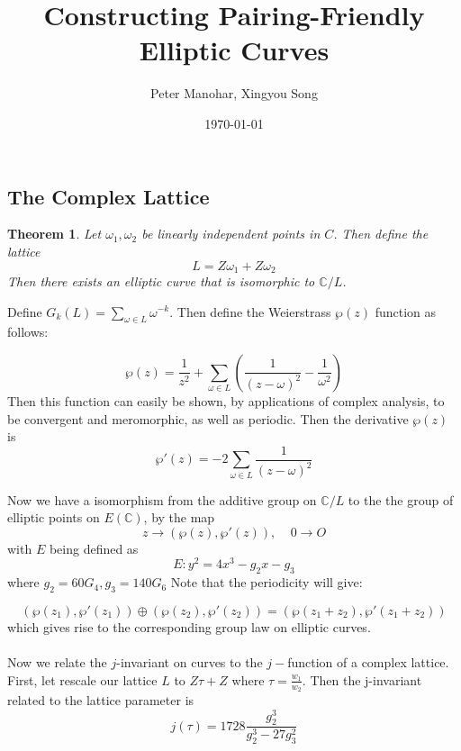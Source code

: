 \documentclass[12pt,twoside]{article}
\title{Constructing Pairing-Friendly Elliptic Curves }
\date{\today}
\author{ Peter Manohar, Xingyou Song}
\newtheorem{theorem}{Theorem}
\begin{document}
\subsection{The Complex Lattice}
\begin{theorem} 
Let $\omega_{1}, \omega_{2}$ be linearly independent points in $C$. Then define the lattice 
$$ L = Z\omega_{1} + Z \omega_{2}$$ Then there exists an elliptic curve that is isomorphic to $\mathbb{C}/ L$. 
\end{theorem}
Define $G_{k}(L) = \sum_{\omega \in L}\omega^{-k}$. Then define the Weierstrass $\wp (z) $ function as follows: 

\begin{equation} 
\wp(z) = \frac{1}{z^{2}} + \sum_{\omega \in L}\left(\frac{1}{(z-\omega)^{2}} - \frac{1}{\omega^{2}}\right) 
\end{equation}  
Then this function can easily be shown, by applications of complex analysis, to be convergent and meromorphic, as well as periodic. Then the derivative $\wp(z)$ is 
\begin{equation} 
\wp ' (z) = -2 \sum_{\omega \in L} \frac{1}{(z- \omega)^{2}} 
\end{equation} 

Now we have a isomorphism from the additive group on $\mathbb{C}/L$ to the the group of elliptic points on $E(\mathbb{C})$, by the map $$z \rightarrow ( \wp(z), \wp' (z)), \> \> \> \> \> 0 \rightarrow O $$ with $E$ being defined as 
\begin{equation} 
E: y^{2} = 4x^{3} - g_{2}x - g_{3} 
\end{equation} 
where $g_{2} = 60G_{4}, g_{3} = 140G_{6}$  
Note that the periodicity will give: 

\begin{equation} 
(\wp(z_{1}), \wp'(z_{1})) \oplus (\wp(z_{2}), \wp'(z_{2})) = (\wp(z_{1} + z_{2}), \wp'(z_{1} + z_{2})) 
\end{equation} which gives rise to the corresponding group law on elliptic curves. \\ \\
\noindent Now we relate the $j$-invariant on curves to the $j-$function of a complex lattice. First, let rescale our lattice $L$ to $Z\tau + Z$ where $\tau = \frac{w_{1}}{w_{2}}$. Then the j-invariant related to the lattice parameter is 
\begin{equation}
j(\tau) = 1728 \frac{g_{2}^{3}}{g_{2}^{3} - 27 g_{3}^{2}} 
\end{equation} 
 
\end{document}
